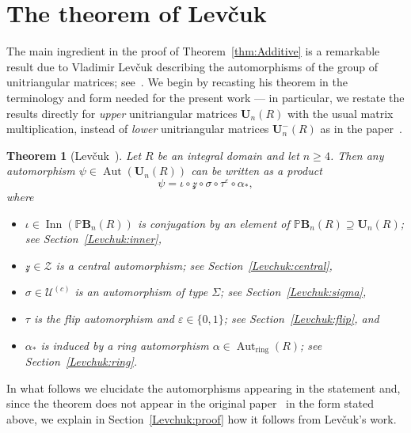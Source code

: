\documentclass[a4paper,11pt]{amsart}
\numberwithin{equation}{section}
\theoremstyle{plain}
\newtheorem{thm}{Theorem}[section]
\theoremstyle{definition}
\newcommand{\anel}[1]{#1_{\text{ring}}} %
\newcommand{\mbU}{\mathbf{U}} %
\newcommand{\PB}{\mathbb{P}\mathbf{B}} %
\newcommand{\veps}{\varepsilon} %
\newcommand{\set}[1]{\{ #1 \}}
\newcommand{\mc}{\mathcal}
\DeclareMathOperator{\Aut}{Aut}
\DeclareMathOperator{\Inn}{Inn}
\begin{document}
\section{The theorem of Lev\v{c}uk} \label{sec:Levchuk}

The main ingredient in the proof of Theorem~\ref{thm:Additive} is a remarkable result due to Vladimir Lev\v{c}uk describing the automorphisms of the group of unitriangular matrices; see~\cite{LevchukOriginal}. 
We begin by recasting his theorem in the terminology and form needed for the present work --- in particular, we restate the results directly for \emph{upper} unitriangular matrices $\mbU_n(R)$ with the usual matrix multiplication, instead of \emph{lower} unitriangular matrices $\mbU^{-}_n(R)$ as in the paper~\cite{LevchukOriginal}. 

\begin{thm}[{Lev\v{c}uk~\cite{LevchukOriginal}}] \label{thm:Levchuk}
Let $R$ be an integral domain and let $n \geq 4$. Then any automorphism $\psi \in \Aut(\mbU_n(R))$ can be written as a product 
\[\psi = \iota \circ \mc{z} \circ \sigma \circ \tau^\veps \circ \alpha_\ast, \]
 where 
 \begin{itemize}
     \item $\iota \in \Inn(\PB_n(R))$ is conjugation by an element of $\PB_n(R) \supseteq \mbU_n(R)$; see Section~\ref{Levchuk:inner},
     \item $\mc{z} \in \mc{Z}$ is a central automorphism; see Section~\ref{Levchuk:central}, 
     \item $\sigma \in \mc{U}^{(c)}$ is an automorphism of type $\Sigma$; see Section~\ref{Levchuk:sigma}, 
     \item $\tau$ is the flip automorphism and $\veps \in \set{0,1}$; see Section~\ref{Levchuk:flip}, and 
     \item $\alpha_\ast$ is induced by a ring automorphism $\alpha \in \anel{\Aut}(R)$; see Section~\ref{Levchuk:ring}.
 \end{itemize}
\end{thm}

In what follows we elucidate the automorphisms appearing in the statement and, since the theorem does not appear in the original paper~\cite{LevchukOriginal} in the form stated above, we explain in Section~\ref{Levchuk:proof} how it follows from Lev\v{c}uk's work. 
\end{document}
